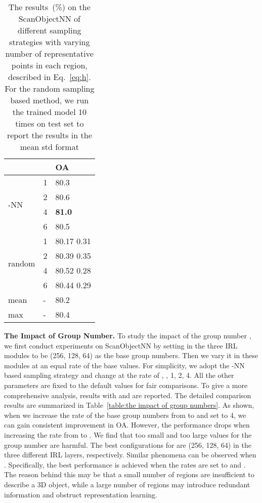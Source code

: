 \documentclass[journal]{IEEEtran}
\begin{document}
\begin{table}[h] 
\small
\caption{The results~(\%) on the ScanObjectNN of different sampling strategies  with varying number of representative points  in each region, described in Eq.~\eqref{eq:h}. For the random sampling based method, we run the trained model 10 times on test set to report the results in the mean  std format}
\centering
\begin{tabular}{|p{2.3cm}<{\centering}|p{1.3cm}<{\centering}|p{3.8cm}<{\centering}|}   
\hline
  &  & OA  \\
\hline
\multirow{4}{*}{-NN} & 1 & 80.3  \\
                    & 2  & 80.6 \\
                    & 4  & \textbf{81.0}\\
                    & 6  & 80.5\\
\hline
\multirow{4}{*}{random} & 1 & 80.17  0.31\\
                    & 2   & 80.39  0.35\\
                    & 4   & 80.52  0.28 \\
                    & 6   & 80.44  0.29 \\
\hline 
\multirow{1}{*}{mean} & - & 80.2 \\
\multirow{1}{*}{max} & -  & 80.4 \\
\hline
\end{tabular}

\label{table:sample_strategy}
\end{table}

\noindent\textbf{The Impact of Group Number.}\label{group_num}
To study the impact of the group number , we first conduct experiments on ScanObjectNN by setting  in the three IRL modules to be (256, 128, 64) as the base group numbers. Then we vary it in these modules at an equal rate of the base values. For simplicity, we adopt the -NN based sampling strategy and change  at the rate of , , 1, 2, 4. All the other parameters are fixed to the default values for fair comparisons. To give a more comprehensive analysis, results with  and  are reported. The detailed comparison results are summarized in Table~\ref{table:the impact of group numbers}. 
As shown, when we increase the rate of the base group numbers from  to  and set  to 4, we can gain consistent improvement in OA. However, the performance drops when increasing the rate from  to . We find that too small and too large values for the group number are harmful. The best configurations for  are (256, 128, 64) in the three different IRL layers, respectively. Similar phenomena can be observed when . Specifically, the best performance is achieved when the rates are set to  and . The reason behind this may be that a small number of regions are insufficient to describe a 3D object, while a large number of regions may introduce redundant information and obstruct representation learning.    
\end{document}
